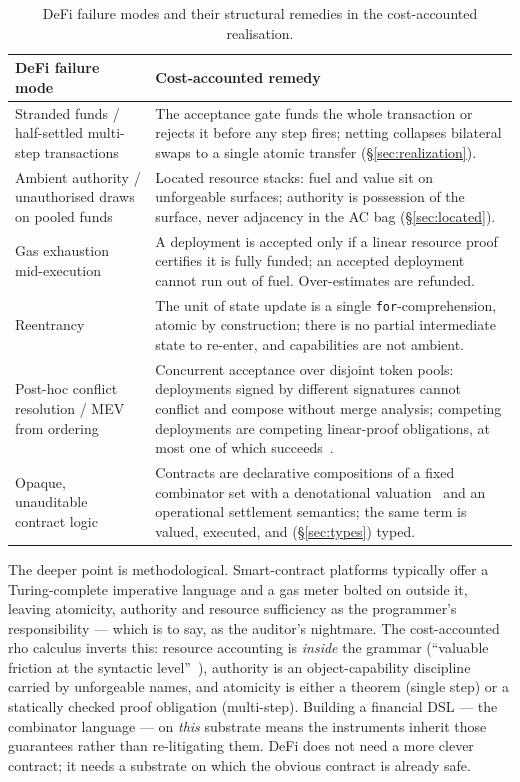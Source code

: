 \documentclass[11pt]{article}
\theoremstyle{definition}
\theoremstyle{plain}
\newcommand{\rcalc}{rho calculus}
\begin{document}
\begin{table}[t]
\centering\small
\begin{tabular}{@{}p{}p{}@{}}
\toprule
\textbf{DeFi failure mode} & \textbf{Cost-accounted remedy} \\
\midrule
Stranded funds / half-settled multi-step transactions & The acceptance gate funds the whole
transaction or rejects it before any step fires; netting collapses bilateral swaps to a single
atomic transfer (\S\ref{sec:realization}). \\
\addlinespace
Ambient authority / unauthorised draws on pooled funds & Located resource stacks: fuel and value sit
on unforgeable surfaces; authority is possession of the surface, never adjacency in the
AC bag (\S\ref{sec:located}). \\
\addlinespace
Gas exhaustion mid-execution & A deployment is accepted only if a linear resource proof certifies it
is fully funded; an accepted deployment cannot run out of fuel. Over-estimates are refunded. \\
\addlinespace
Reentrancy & The unit of state update is a single \texttt{for}-comprehension, atomic by construction;
there is no partial intermediate state to re-enter, and capabilities are not ambient. \\
\addlinespace
Post-hoc conflict resolution / MEV from ordering & Concurrent acceptance over disjoint token pools:
deployments signed by different signatures cannot conflict and compose without merge analysis;
competing deployments are competing linear-proof obligations, at most one of which
succeeds~\cite[\S8.8]{CAR2026,Daian2020}. \\
\addlinespace
Opaque, unauditable contract logic & Contracts are declarative compositions of a fixed combinator set
with a denotational valuation~\cite{SPJ2000} and an operational settlement semantics; the same term
is valued, executed, and (\S\ref{sec:types}) typed. \\
\bottomrule
\end{tabular}
\caption{DeFi failure modes and their structural remedies in the cost-accounted realisation.}
\label{tab:defi}
\end{table}

The deeper point is methodological. Smart-contract platforms typically offer a Turing-complete
imperative language and a gas meter bolted on outside it, leaving atomicity, authority and resource
sufficiency as the programmer's responsibility --- which is to say, as the auditor's nightmare. The
cost-accounted \rcalc{} inverts this: resource accounting is \emph{inside} the grammar (``valuable
friction at the syntactic level''~\cite[\S5.3]{CAR2026}), authority is an object-capability discipline
carried by unforgeable names, and atomicity is either a theorem (single step) or a statically checked
proof obligation (multi-step). Building a financial DSL --- the combinator language --- on \emph{this}
substrate means the instruments inherit those guarantees rather than re-litigating them. DeFi does not
need a more clever contract; it needs a substrate on which the obvious contract is already safe.
\end{document}
